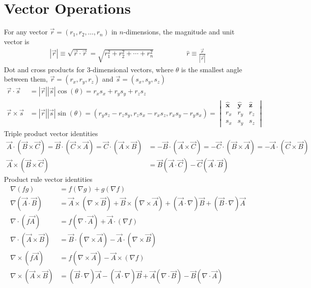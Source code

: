 \section{Vector Operations}
For any vector $\vec{r}=(r_1,r_2,\dots,r_n)$ in $n$-dimensions, the magnitude and unit vector is
\begin{align}
|\vec{r}|\equiv\sqrt{\vec{r}\cdot\vec{r}}=\sqrt{r_1^2+r_2^2+\cdots+r_n^2} \hspace{2cm} \hat{r}\equiv\frac{\vec{r}}{|\vec{r}|}
\end{align}
Dot and cross products for 3-dimensional vectors, where $\theta$ is the smallest angle between them, $\vec{r}=(r_x,r_y,r_z)$ and $\vec{s}=(s_x,s_y,s_z)$
\begin{align}
\vec{r}\cdot \vec{s} &=|\vec{r}||\vec{s}|\cos(\theta)=r_xs_x+r_ys_y+r_zs_z \\
\vec{r} \times \vec{s} &= |\vec{r}||\vec{s}|\sin(\theta)= (r_ys_z-r_zs_y, r_zs_x-r_xs_z, r_xs_y-r_ys_x) =  \begin{vmatrix}
\boldsymbol{\hat{x}} & \boldsymbol{\hat{y}} & \boldsymbol{\hat{z}} \\ 
r_x & r_y & r_z \\ 
s_x & s_y & s_z 
\end{vmatrix}
\end{align}
Triple product vector identities
\begin{align}
\vec{A}\cdot (\vec{B} \times \vec{C}) = \vec{B}\cdot (\vec{C}\times \vec{A})= \vec{C}\cdot(\vec{A}\times \vec{B}) &= -\vec{B}\cdot (\vec{A} \times \vec{C}) = -\vec{C}\cdot (\vec{B} \times \vec{A})=-\vec{A}\cdot (\vec{C} \times \vec{B}) \\
\vec{A}\times (\vec{B}\times \vec{C}) &=\vec{B}(\vec{A}\cdot\vec{C})-\vec{C}(\vec{A}\cdot\vec{B})
\end{align}
Product rule vector identities
\begin{align}
	\nabla (fg) &= f(\nabla g) + g(\nabla f) \\
	\nabla (\vec{A} \cdot \vec{B}) &= \vec{A} \times(\nabla \times \vec{B})+ \vec{B} \times (\nabla \times \vec{A}) + (\vec{A} \cdot \nabla)\vec{B} + (\vec{B} \cdot \nabla)\vec{A} \\
	\nabla \cdot (f\vec{A}) &= f(\nabla  \cdot \vec{A}) + \vec{A} \cdot (\nabla f) \\
	\nabla \cdot (\vec{A} \times \vec{B}) &= \vec{B} \cdot (\nabla \times \vec{A}) - \vec{A} \cdot (\nabla \times \vec{B}) \\
	\nabla \times (f\vec{A}) &= f(\nabla \times \vec{A})- \vec{A} \times (\nabla f) \\
	\nabla \times (\vec{A}\times\vec{B}) &= (\vec{B}\cdot \nabla)\vec{A}-(\vec{A}\cdot\nabla)\vec{B}+\vec{A}(\nabla \cdot \vec{B})-\vec{B}(\nabla\cdot\vec{A})
\end{align}
